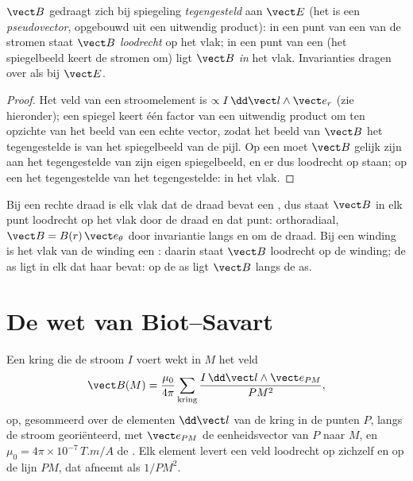\begin{proposition}\label{prop:b1:magnetostatics:symmetry}
$\vect B$ gedraagt zich bij spiegeling \emph{tegengesteld} aan $\vect E$
(het is een \emph{pseudovector}, opgebouwd uit een uitwendig product): in een punt
van een \emph{} van de stromen staat $\vect B$
\emph{loodrecht} op het vlak; in een punt van een
\emph{} (het spiegelbeeld keert de stromen om) ligt $\vect B$
\emph{in} het vlak. Invarianties dragen over als bij $\vect E$.
\end{proposition}

\begin{proof}
Het veld van een stroomelement is $\propto I\,\dd\vect l\wedge\vect e_r$
(zie hieronder); een spiegel keert één factor van een uitwendig product om ten opzichte van het
beeld van een echte vector, zodat het beeld van $\vect B$ het tegengestelde is van het
spiegelbeeld van de pijl. Op een  moet $\vect B$ gelijk zijn aan het
tegengestelde van zijn eigen spiegelbeeld, en er dus loodrecht op staan; op een
 het tegengestelde van het tegengestelde: in het vlak.
\end{proof}

\begin{example}\label{ex:b1:magnetostatics:symmetryuse}
Bij een rechte draad is elk vlak dat de draad bevat een ,
dus staat $\vect B$ in elk punt loodrecht op het vlak door de
draad en dat punt: orthoradiaal, $\vect B = B(r)\,\vect e_\theta$ door
invariantie langs en om de draad. Bij een winding is het vlak van de winding
een : daarin staat $\vect B$ loodrecht op de winding; de as
ligt in elk  dat haar bevat: op de as ligt $\vect B$
langs de as.
\end{example}

\section{De wet van Biot--Savart}

\begin{theorem}\label{thm:b1:magnetostatics:biotsavart}
Een kring die de stroom $I$ voert wekt in $M$ het veld
\[
\vect B(M) = \frac{\mu_0}{4\pi}\sum_{\text{kring}} \frac{I\,\dd\vect l\wedge\vect e_{PM}}{PM^2} ,
\]
op, gesommeerd over de elementen $\dd\vect l$ van de kring in de punten $P$,
langs de stroom georiënteerd, met $\vect e_{PM}$ de eenheidsvector van
$P$ naar $M$, en $\mu_0 = 4\pi \times 10^{-7}\,\unit{T.m/A}$ de
\emph{}. Elk element levert een veld
loodrecht op zichzelf en op de lijn $PM$, dat afneemt als $1/PM^2$.
\end{theorem}
\admitted

